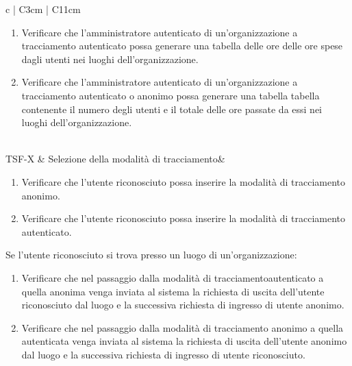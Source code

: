 {\begin{longtable}{ c | C{3cm} | C{11cm} }
\begin{enumerate}
\item Verificare che l'amministratore autenticato di un'organizzazione a tracciamento autenticato possa generare una tabella delle ore delle ore spese dagli utenti nei luoghi dell'organizzazione.
\item Verificare che l'amministratore autenticato di un'organizzazione a tracciamento autenticato o anonimo possa generare una tabella tabella contenente il numero degli utenti e il totale delle ore passate da essi nei luoghi dell’organizzazione. 
\end{enumerate} \\


TSF-X & Selezione della modalità di tracciamento& \begin{enumerate}
    \item Verificare che l'utente riconosciuto possa inserire la modalità di tracciamento anonimo.
    \item Verificare che l'utente riconosciuto possa inserire la modalità di tracciamento autenticato.
\end{enumerate}
Se l'utente riconosciuto si trova presso un luogo di un'organizzazione:
\begin{enumerate}
    \item Verificare che nel passaggio dalla modalità di tracciamentoautenticato a quella anonima venga inviata al sistema la richiesta di uscita dell'utente riconosciuto dal luogo e la successiva richiesta di ingresso di utente anonimo.
    \item Verificare che nel passaggio dalla modalità di tracciamento anonimo a quella autenticata venga inviata al sistema la richiesta di uscita dell'utente anonimo dal luogo e la successiva richiesta di ingresso di utente riconosciuto.
\end{enumerate} \\


\end{longtable}}
